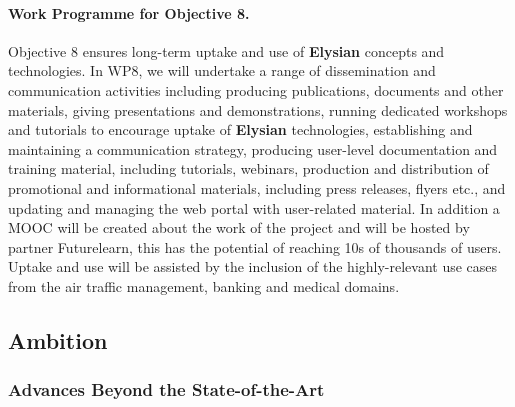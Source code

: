 \documentclass[a4paper,11pt]{article}
\newcommand{\project}[1]{\textbf{#1}\xspace}
\newcommand{\SECURITY}{\project{Elysian}}
\newcommand{\TheProject}{\SECURITY}
\begin{document}
\paragraph{Work Programme for Objective 8.}

Objective 8 ensures long-term uptake and use of \TheProject{} concepts and technologies. In WP8, we will undertake a range of dissemination and communication activities including producing publications, documents and other materials, giving presentations and demonstrations, running dedicated workshops and tutorials to encourage uptake of \TheProject{} technologies, establishing and maintaining a communication strategy, producing user-level documentation and training material, including tutorials, webinars, production and distribution of promotional and informational materials, including press releases, flyers etc., and updating and managing the web portal with user-related material.  In addition a MOOC will be created about the work of the project and will be hosted by \UODshort{} partner Futurelearn, this has the potential of reaching 10s of thousands of users.  Uptake and use will be assisted by the inclusion of the highly-relevant use cases from the air traffic management, %
banking and medical domains.


\subsection{Ambition}


\subsubsection{Advances Beyond the State-of-the-Art}
\label{sec:novelty}



\end{document}
